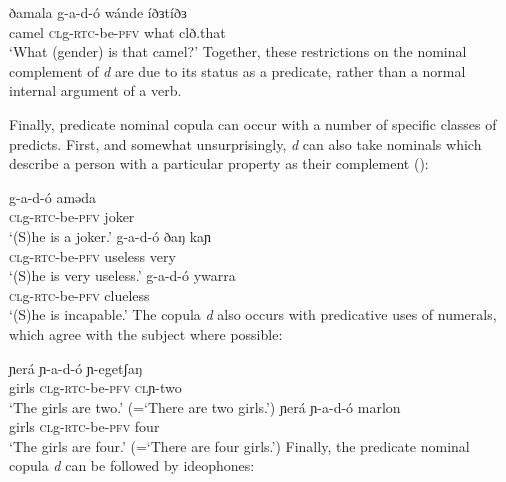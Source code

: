 \z 

\ea \label{nowhncc} \ea  \gll ðamala	g-a-d-ó	 	wánde	íðɜtíðɜ\\
		camel	\textsc{cl}g-\textsc{rtc}-be-\textsc{pfv}	what		clð.that\\
		\glt 	‘What (gender) is that camel?’
\z \z 
Together, these restrictions on the nominal complement of \textit{d} are due to its status as a predicate, rather than a normal internal argument of a verb. 

Finally, predicate nominal copula can occur with a number of specific classes of predicts. First, and somewhat unsurprisingly, \textit{d} can also take nominals which describe a person with a particular property as their complement ():

\ea 
\ea \gll g-a-d-ó aməda\\
\textsc{cl}g-\textsc{rtc}-be-\textsc{pfv} joker\\
\glt `(S)he is a joker.'
\ex \gll g-a-d-ó ðaŋ kaɲ\\
\textsc{cl}g-\textsc{rtc}-be-\textsc{pfv}  useless very\\
\glt  `(S)he is very useless.'
\ex \gll g-a-d-ó ywarra\\ %
\textsc{cl}g-\textsc{rtc}-be-\textsc{pfv} clueless\\
\glt  `(S)he is incapable.'
\z
\z
The copula \textit{d}  also occurs with predicative uses of numerals, which agree with the subject where possible:

\ea 
\ea \gll ɲerá ɲ-a-d-ó ɲ-egetʃaŋ\\
girls \textsc{cl}g-\textsc{rtc}-be-\textsc{pfv} \textsc{cl}ɲ-two\\
\glt `The girls are two.' (=`There are two girls.')
\ex \gll ɲerá ɲ-a-d-ó marlon\\
girls \textsc{cl}g-\textsc{rtc}-be-\textsc{pfv} four\\
\glt `The girls are four.' (=`There are four girls.')
\z
\z
Finally, the predicate nominal copula \textit{d} can be followed by ideophones:


